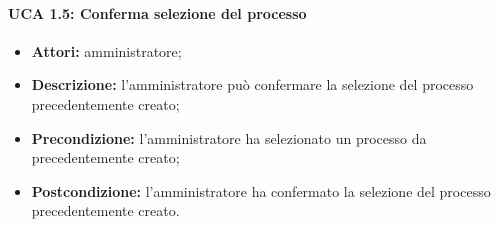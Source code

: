 \paragraph{UCA 1.5: Conferma selezione del processo}
\begin{itemize}
\item \textbf{Attori:} 
amministratore;
\item \textbf{Descrizione:} 
l'amministratore può confermare la selezione del processo precedentemente creato; 
\item \textbf{Precondizione:} 
l'amministratore ha selezionato un processo da precedentemente creato;
\item \textbf{Postcondizione:} 
l'amministratore ha confermato la selezione del processo precedentemente creato.
\end{itemize}
